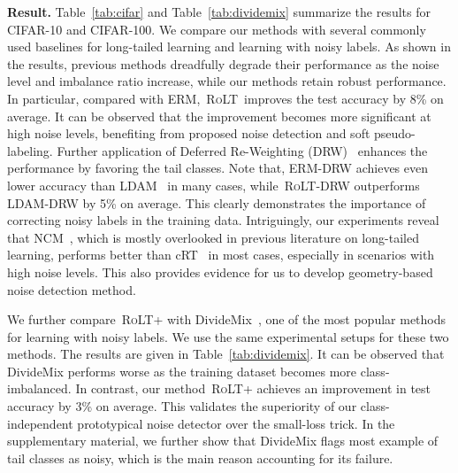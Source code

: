 \documentclass{article}
\def\algo{{\textsc{RoLT}}}
\begin{document}
\textbf{Result.} Table~\ref{tab:cifar} and Table~\ref{tab:dividemix} summarize the results for CIFAR-10 and CIFAR-100. We compare our methods with several commonly used baselines for long-tailed learning and learning with noisy labels. As shown in the results, previous methods dreadfully degrade their performance as the noise level and imbalance ratio increase, while our methods retain robust performance. In particular, compared with ERM,~\algo~improves the test accuracy by 8\% on average. It can be observed that the improvement becomes more significant at high noise levels, benefiting from proposed noise detection and soft pseudo-labeling. Further application of Deferred Re-Weighting (DRW)~\cite{DBLP:conf/nips/CaoWGAM19ldam} enhances the performance by favoring the tail classes. Note that, ERM-DRW achieves even lower accuracy than LDAM~\cite{DBLP:conf/nips/CaoWGAM19ldam} in many cases, while~\algo-DRW outperforms LDAM-DRW by 5\% on average. This clearly demonstrates the importance of correcting noisy labels in the training data. Intriguingly, our experiments reveal that NCM~\cite{DBLP:conf/iclr/KangXRYGFK20}, which is mostly overlooked in previous literature on long-tailed learning, performs better than cRT~\cite{DBLP:conf/iclr/KangXRYGFK20} in most cases, especially in scenarios with high noise levels. This also provides evidence 
for us to develop geometry-based noise detection method.

We further compare~\algo+ with DivideMix~\cite{li2020dividemix}, one of the most popular methods for learning with noisy labels. We use the same experimental setups for these two methods. The results are given in Table~\ref{tab:dividemix}. It can be observed that DivideMix performs worse as the training dataset becomes more class-imbalanced. In contrast, our method~\algo+ achieves an improvement in test accuracy by 3\% on average. This validates the superiority of our class-independent prototypical noise detector over the small-loss trick. In the supplementary material, we further show that DivideMix flags most example of tail classes as noisy, which is the main reason accounting for its failure.
\end{document}
